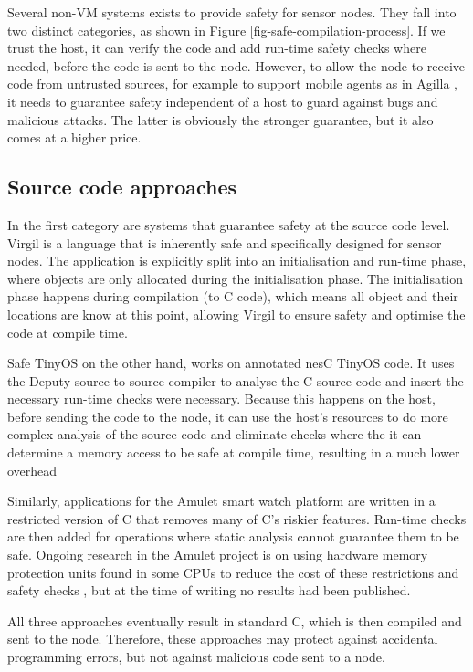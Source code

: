 Several non-VM systems exists to provide safety for sensor nodes. They fall into two distinct categories, as shown in Figure \ref{fig-safe-compilation-process}. If we trust the host, it can verify the code and add run-time safety checks where needed, before the code is sent to the node. However, to allow the node to receive code from untrusted sources, for example to support mobile agents as in Agilla \cite{Fok:2005bh}, it needs to guarantee safety independent of a host to guard against bugs and malicious attacks. The latter is obviously the stronger guarantee, but it also comes at a higher price.

\subsection{Source code approaches}
\label{sec-state-of-the-art-source-code-safety}
In the first category are systems that guarantee safety at the source code level. Virgil \cite{Titzer:2006uy} is a language that is inherently safe and specifically designed for sensor nodes. The application is explicitly split into an initialisation and run-time phase, where objects are only allocated during the initialisation phase. The initialisation phase happens during compilation (to C code), which means all object and their locations are know at this point, allowing Virgil to ensure safety and optimise the code at compile time.

Safe TinyOS \cite{Cooprider:2007ub} on the other hand, works on annotated nesC TinyOS code. It uses the Deputy \cite{Condit:2007uo} source-to-source compiler to analyse the C source code and insert the necessary run-time checks were necessary. Because this happens on the host, before sending the code to the node, it can use the host's resources to do more complex analysis of the source code and eliminate checks where the it can determine a memory access to be safe at compile time, resulting in a much lower overhead

Similarly, applications for the Amulet \cite{Hester:2016je} smart watch platform are written in a restricted version of C that removes many of C's riskier features. Run-time checks are then added for operations where static analysis cannot guarantee them to be safe. Ongoing research in the Amulet project is on using hardware memory protection units found in some CPUs to reduce the cost of these restrictions and safety checks \cite{Hardin:2017cq}, but at the time of writing no results had been published.

All three approaches eventually result in standard C, which is then compiled and sent to the node. Therefore, these approaches may protect against accidental programming errors, but not against malicious code sent to a node.

